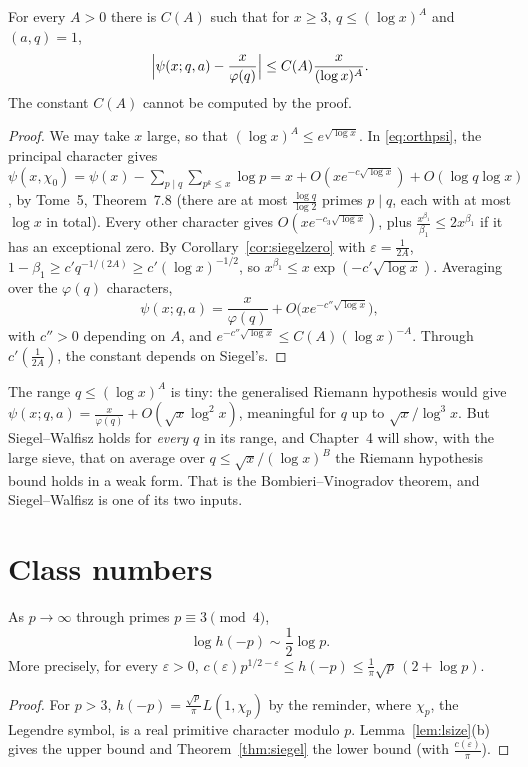 \begin{corollary}\label{cor:sw}
For every $A>0$ there is $C(A)$ such that for $x\ge3$, $q\le(\log x)^A$ and $(a,q)=1$,
\[
\Bigl|\psi(x;q,a)-\frac x{\varphi(q)}\Bigr|\le C(A)\frac x{(\log x)^A}.
\]
The constant $C(A)$ cannot be computed by the proof.
\end{corollary}
\begin{proof}
We may take $x$ large, so that $(\log x)^A\le e^{\sqrt{\log x}}$. In \eqref{eq:orthpsi}, the principal character gives $\psi(x,\chi_0)=\psi(x)-\sum_{p\mid q}\sum_{p^k\le x}\log p=x+O(xe^{-c\sqrt{\log x}})+O(\log q\log x)$, by Tome~5, Theorem~7.8 (there are at most $\frac{\log q}{\log2}$ primes $p\mid q$, each with at most $\log x$
in total). Every other character gives $O(xe^{-c_3\sqrt{\log x}})$, plus $\frac{x^{\beta_1}}{\beta_1}\le2x^{\beta_1}$ if it has an exceptional zero. By Corollary~\ref{cor:siegelzero} with $\varepsilon=\frac1{2A}$, $1-\beta_1\ge c'q^{-1/(2A)}\ge c'(\log x)^{-1/2}$, so $x^{\beta_1}\le x\exp(-c'\sqrt{\log x})$. Averaging over the $\varphi(q)$ characters,
\[
\psi(x;q,a)=\frac x{\varphi(q)}+O\bigl(xe^{-c''\sqrt{\log x}}\bigr),
\]
with $c''>0$ depending on $A$, and $e^{-c''\sqrt{\log x}}\le C(A)(\log x)^{-A}$. Through $c'(\frac1{2A})$, the constant depends on Siegel's.
\end{proof}

The range $q\le(\log x)^A$ is tiny: the generalised Riemann hypothesis would give $\psi(x;q,a)=\frac x{\varphi(q)}+O(\sqrt x\log^2x)$, meaningful for $q$ up to $\sqrt x/\log^3x$. But Siegel--Walfisz holds for \emph{every} $q$ in its range, and Chapter~4 will show, with the large sieve, that on average over $q\le\sqrt x/(\log x)^B$
the Riemann hypothesis bound holds in a weak form. That is the Bombieri--Vinogradov theorem, and Siegel--Walfisz is one of its two inputs.

\section{Class numbers}

\begin{theorem}[Siegel, 1935]\label{thm:classnumber}
As $p\to\infty$ through primes $p\equiv3\pmod4$,
\[
\log h(-p)\sim\frac12\log p.
\]
More precisely, for every $\varepsilon>0$, $c(\varepsilon)p^{1/2-\varepsilon}\le h(-p)\le\frac1\pi\sqrt p\,(2+\log p)$.
\end{theorem}
\begin{proof}
For $p>3$, $h(-p)=\frac{\sqrt p}\pi L(1,\chi_p)$ by the reminder, where $\chi_p$, the Legendre symbol, is a real primitive character modulo $p$. Lemma~\ref{lem:lsize}(b) gives the upper bound and Theorem~\ref{thm:siegel} the lower bound (with $\frac{c(\varepsilon)}\pi$).
\end{proof}

